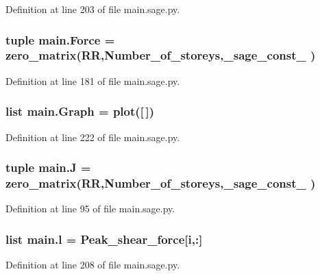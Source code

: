 Definition at line 203 of file main.\+sage.\+py.

\hypertarget{namespacemain_aa91561fad2579200e566fa01f3cbc359}{}
\subsubsection[{Force}]{\setlength{\rightskip}{0pt plus 5cm}tuple main.\+Force = zero\+\_\+matrix(R\+R,Number\+\_\+of\+\_\+storeys,\+\_\+sage\+\_\+const\+\_ )}\label{namespacemain_aa91561fad2579200e566fa01f3cbc359}


Definition at line 181 of file main.\+sage.\+py.

\hypertarget{namespacemain_ad40f6b3437e83a0385177ac65a317b97}{}
\subsubsection[{Graph}]{\setlength{\rightskip}{0pt plus 5cm}list main.\+Graph = plot(\mbox{[}$\,$\mbox{]})}\label{namespacemain_ad40f6b3437e83a0385177ac65a317b97}


Definition at line 222 of file main.\+sage.\+py.

\hypertarget{namespacemain_a00488f5887e168f7781b6fb94dd08518}{}
\subsubsection[{J}]{\setlength{\rightskip}{0pt plus 5cm}tuple main.\+J = zero\+\_\+matrix(R\+R,Number\+\_\+of\+\_\+storeys,\+\_\+sage\+\_\+const\+\_ )}\label{namespacemain_a00488f5887e168f7781b6fb94dd08518}


Definition at line 95 of file main.\+sage.\+py.

\hypertarget{namespacemain_a027916efc284622d928c1d8383917f6d}{}
\subsubsection[{l}]{\setlength{\rightskip}{0pt plus 5cm}list main.\+l = {\bf Peak\+\_\+shear\+\_\+force}\mbox{[}{\bf i},\+:\mbox{]}}\label{namespacemain_a027916efc284622d928c1d8383917f6d}


Definition at line 208 of file main.\+sage.\+py.

\hypertarget{namespacemain_a712447a841ce148ad2d1210e57dc7894}{}
